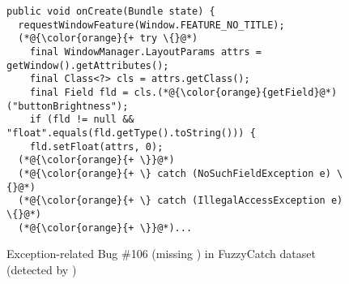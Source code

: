 \begin{figure}[t]%
	\centering
\begin{lstlisting}[]
public void onCreate(Bundle state) {
  requestWindowFeature(Window.FEATURE_NO_TITLE);
  (*@{\color{orange}{+ try \{}@*)
    final WindowManager.LayoutParams attrs = getWindow().getAttributes();
    final Class<?> cls = attrs.getClass();
    final Field fld = cls.(*@{\color{orange}{getField}@*)("buttonBrightness");
    if (fld != null && "float".equals(fld.getType().toString())) {
    fld.setFloat(attrs, 0);
  (*@{\color{orange}{+ \}}@*)
  (*@{\color{orange}{+ \} catch (NoSuchFieldException e) \{}@*)
  (*@{\color{orange}{+ \} catch (IllegalAccessException e) \{}@*)
  (*@{\color{orange}{+ \}}@*)...
\end{lstlisting}
        \vspace{-16pt}
        \caption{Exception-related Bug \#106 (missing ) in FuzzyCatch dataset  (detected by {\tool})}
        \label{fig:example-bug}
\end{figure}
